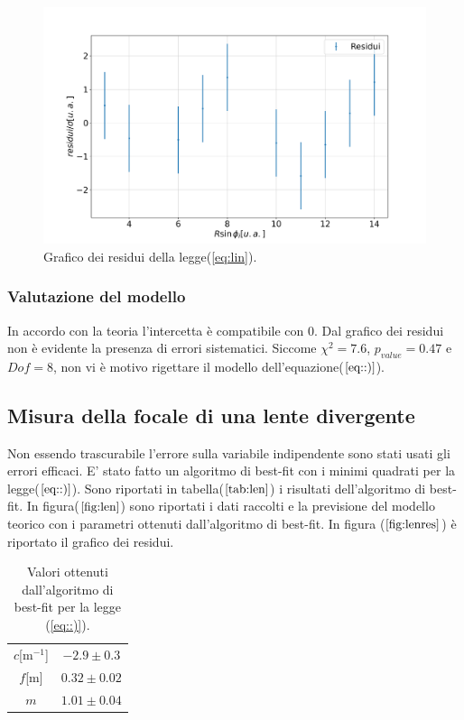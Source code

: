 \documentclass{article}
\begin{document}
\begin{figure}[H]
	\includegraphics[width=\textwidth]{Dati_raccolti_residui.png}
	\caption{Grafico dei residui della legge(\ref{eq:lin}).}
	\label{fig:plexres}
\end{figure}



\subsubsection{Valutazione del modello}

In accordo con la teoria l'intercetta è compatibile con 0.
Dal grafico dei residui non è evidente la presenza di errori sistematici.
Siccome $\chi^2= 7.6$, $p_{value}= 0.47$  e $Dof= 8$,  non vi è motivo rigettare il modello dell'equazione($\ref{eq::)}$).


\subsection{Misura della focale di una lente divergente}

Non essendo trascurabile l'errore sulla variabile indipendente sono stati usati gli errori efficaci.
E' stato fatto un algoritmo di best-fit con i minimi quadrati per la legge($\ref{eq::)}$).
Sono riportati in tabella($\ref{tab:len}$) i risultati dell'algoritmo di best-fit.
In figura($\ref{fig:len}$) sono riportati i dati raccolti e la previsione del modello teorico con i parametri ottenuti dall'algoritmo di best-fit.
In figura ($\ref{fig:lenres}$) è riportato il grafico dei residui.


\begin{table}[H]
		\centering
			\begin{tabular}{|cc|}
				\hline
				$c $[m$^{-1}$] & $ -2.9 \pm 0.3$\\
				$f$[m] & $0.32\pm 0.02$\\
				$m$ & $ 1.01 \pm 0.04$\\
				\hline
			\end{tabular}
		\caption{Valori ottenuti dall'algoritmo di best-fit per la legge (\ref{eq::)}).}
		\label{tab:len}	
\end{table}
\end{document}

